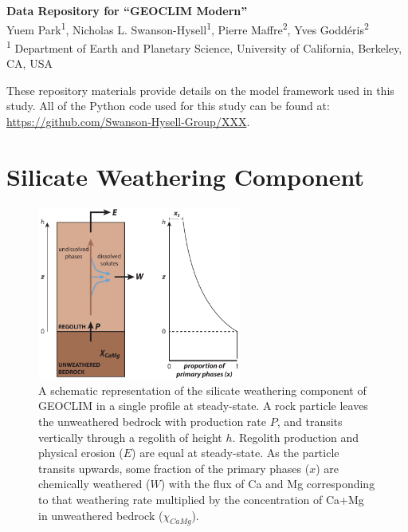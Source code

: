 \documentclass[11pt,letterpaper]{article}
\begin{document}
\begin{flushleft}
{\Large \textbf{Data Repository for ``GEOCLIM Modern''}}
\\
Yuem Park\textsuperscript{1},
Nicholas L. Swanson-Hysell\textsuperscript{1},
Pierre Maffre\textsuperscript{2},
Yves Godd\'eris\textsuperscript{2}
\\
\bigskip
\textsuperscript{1} Department of Earth and Planetary Science, University of California, Berkeley, CA, USA
\\
\bigskip

\end{flushleft}

\linenumbers

These repository materials provide details on the model framework used in this study. All of the Python code used for this study can be found at: \url{https://github.com/Swanson-Hysell-Group/XXX}.

\section*{Silicate Weathering Component}

\begin{figure}
\begin{center}
	\includegraphics[width=0.6\textwidth]{../Figures/regolith_schematic.pdf}
	\caption{A schematic representation of the silicate weathering component of GEOCLIM in a single profile at steady-state. A rock particle leaves the unweathered bedrock with production rate $P$, and transits vertically through a regolith of height $h$. Regolith production and physical erosion ($E$) are equal at steady-state. As the particle transits upwards, some fraction of the primary phases ($x$) are chemically weathered ($W$) with the flux of Ca and Mg corresponding to that weathering rate multiplied by the concentration of Ca+Mg in unweathered bedrock ($\chi_{CaMg}$).}
	\label{fig:regolith_schematic}
\end{center}
\end{figure}
\end{document}
